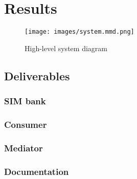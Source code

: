 \chapter{Results}

\begin{figure}[ht]
	\texttt{[image: images/system.mmd.png]}
	\caption{High-level system diagram}
	\label{system-diagram}
\end{figure}

\section{Deliverables}

\subsection{SIM bank}

\subsection{Consumer}

\subsection{Mediator}

\subsection{Documentation}
